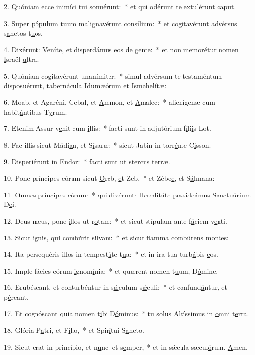 2. Quóniam ecce inimíci tui s\uline{o}nu\uline{é}runt:~* et qui odérunt te extul\uline{é}runt c\uline{a}put.\par 
3. Super pópulum tuum malignav\uline{é}runt cons\uline{í}lium:~* et cogitavérunt advérsus s\uline{a}nctos t\uline{u}os.\par 
4. Dixérunt: Veníte, et disperdámus \uline{e}os de g\uline{e}nte:~* et non memorétur nomen \uline{I}sraël \uline{u}ltra.\par 
5. Quóniam cogitavérunt \uline{u}nan\uline{í}miter:~* simul advérsum te testaméntum disposuérunt, tabernácula Idumæórum et Ism\uline{a}hel\uline{í}tæ:\par 
6. Moab, et Agaréni, Gebal, et \uline{A}mmon, et \uline{A}malec:~* alienígenæ cum habit\uline{á}ntibus T\uline{y}rum.\par 
7. Etenim Assur v\uline{e}nit cum \uline{i}llis:~* facti sunt in adjutórium f\uline{í}li\uline{i}s Lot.\par 
8. Fac illis sicut Mádi\uline{a}n, et S\uline{í}saræ:~* sicut Jabin in torr\uline{é}nte C\uline{i}sson.\par 
9. Disperi\uline{é}runt in \uline{E}ndor:~* facti sunt ut st\uline{e}rcus t\uline{e}rræ.\par 
10. Pone príncipes eórum sicut \uline{O}reb, \uline{e}t Zeb,~* et Zébe\uline{e}, et S\uline{á}lmana:\par 
11. Omnes príncip\uline{e}s e\uline{ó}rum:~* qui dixérunt: Hereditáte possideámus Sanctu\uline{á}rium D\uline{e}i.\par 
12. Deus meus, pone \uline{i}llos ut r\uline{o}tam:~* et sicut stípulam ante f\uline{á}ciem v\uline{e}nti.\par 
13. Sicut ignis, qui comb\uline{ú}rit s\uline{i}lvam:~* et sicut flamma comb\uline{ú}rens m\uline{o}ntes:\par 
14. Ita persequéris illos in tempest\uline{á}te t\uline{u}a:~* et in ira tua turb\uline{á}bis \uline{e}os.\par 
15. Imple fácies eórum \uline{i}gnom\uline{í}nia:~* et quærent nomen t\uline{u}um, D\uline{ó}mine.\par 
16. Erubéscant, et conturbéntur in s\uline{ǽ}culum s\uline{ǽ}culi:~* et confund\uline{á}ntur, et p\uline{é}reant.\par 
17. Et cognóscant quia nomen t\uline{i}bi D\uline{ó}minus:~* tu solus Altíssimus in \uline{o}mni t\uline{e}rra.\par 
18. Glória P\uline{a}tri, et F\uline{í}lio,~* et Spir\uline{í}tui S\uline{a}ncto.\par 
19. Sicut erat in princípio, et n\uline{u}nc, et s\uline{e}mper,~* et in sǽcula sæcul\uline{ó}rum. \uline{A}men.\par 
